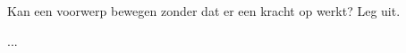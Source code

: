 
\begin{exercise}



Kan een voorwerp bewegen zonder dat er een kracht op werkt? Leg uit.


\begin{oplossing}
...
\end{oplossing}

\end{exercise}
